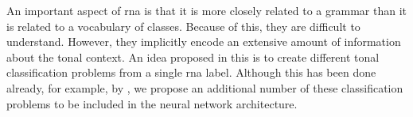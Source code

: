 

An important aspect of \gls{rna} is that it is
more closely related to a grammar than it is related to a
vocabulary of classes. Because of this, they are difficult
to understand. However, they implicitly encode an extensive
amount of information about the tonal context. An idea
proposed in this \thesisdiss{} is to create different tonal
classification problems from a single \gls{rna}
label. Although this has been done already, for example, by
\textcite{chen2018functional}, we propose an additional
number of these classification problems to be included in
the neural network architecture.
